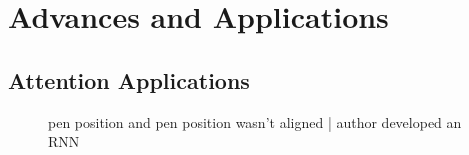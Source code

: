 \documentclass[11pt]{article}
\begin{document}
\begin{figure}[H]
    \centering
\end{figure}

\begin{figure}[H]
    \centering
\end{figure}

\begin{figure}[H]
    \centering
\end{figure}

\begin{figure}[H]
    \centering
\end{figure}

\begin{figure}[H]
    \centering
\end{figure}

\begin{figure}[H]
    \centering
\end{figure}

\begin{figure}[H]
    \centering
\end{figure}

\section{Advances and Applications}

\subsection{Attention Applications}

\begin{figure}[H]
    \centering
    \caption*{pen position and pen position wasn't aligned | author developed an RNN}
\end{figure}

\begin{figure}[H]
    \centering
    \caption{}
\end{figure}
\end{document}
